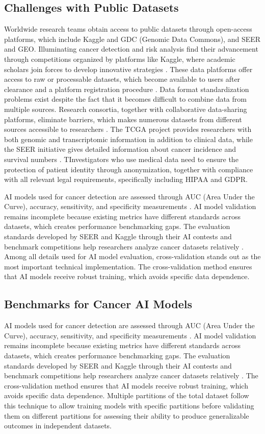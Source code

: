 \documentclass[conference]{IEEEtran}
\begin{document}
\subsection{Challenges with Public Datasets}
Worldwide research teams obtain access to public datasets through open-access platforms, which include Kaggle and GDC (Genomic Data Commons), and SEER and GEO. Illuminating cancer detection and risk analysis find their advancement through competitions organized by platforms like Kaggle, where academic scholars join forces to develop innovative strategies \cite{27}. These data platforms offer access to raw or processable datasets, which become available to users after clearance and a platform registration procedure \cite{25}. Data format standardization problems exist despite the fact that it becomes difficult to combine data from multiple sources.
Research consortia, together with collaborative data-sharing platforms, eliminate barriers, which makes numerous datasets from different sources accessible to researchers \cite{4}. The TCGA project provides researchers with both genomic and transcriptomic information in addition to clinical data, while the SEER initiative gives detailed information about cancer incidence and survival numbers \cite{18}. 
TInvestigators who use medical data need to ensure the protection of patient identity through anonymization, together with compliance with all relevant legal requirements, specifically including HIPAA and GDPR.

AI models used for cancer detection are assessed through AUC (Area Under the Curve), accuracy, sensitivity, and specificity measurements \cite{3}. AI model validation remains incomplete because existing metrics have different standards across datasets, which creates performance benchmarking gaps. The evaluation standards developed by SEER and Kaggle through their AI contests and benchmark competitions help researchers analyze cancer datasets relatively \cite{21}.  
Among all details used for AI model evaluation, cross-validation stands out as the most important technical implementation. The cross-validation method ensures that AI models receive robust training, which avoids specific data dependence.
\subsection{Benchmarks for Cancer AI Models}
AI models used for cancer detection are assessed through AUC (Area Under the Curve), accuracy, sensitivity, and specificity measurements \cite{3}. AI model validation remains incomplete because existing metrics have different standards across datasets, which creates performance benchmarking gaps. The evaluation standards developed by SEER and Kaggle through their AI contests and benchmark competitions help researchers analyze cancer datasets relatively \cite{21}. The cross-validation method ensures that AI models receive robust training, which avoids specific data dependence. Multiple partitions of the total dataset follow this technique to allow training models with specific partitions before validating them on different partitions for assessing their ability to produce generalizable outcomes in independent datasets.
\end{document}
